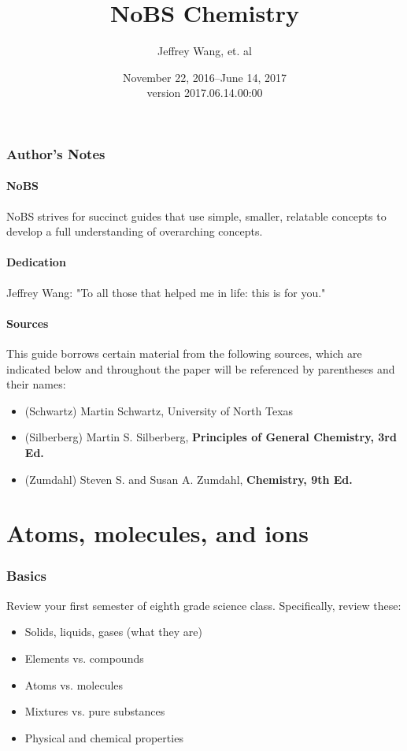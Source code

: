\documentclass[letterpaper, 12pt]{article}
\begin{document}
\title{NoBS Chemistry}
\author{Jeffrey Wang, et. al}
\date{November 22, 2016--June 14, 2017\\version 2017.06.14.00:00}
\maketitle


\setcounter{secnumdepth}{1}
\setcounter{section}{0}


\tableofcontents
\clearpage

\section*{Author's Notes}
	\subsection{NoBS}
	NoBS strives for succinct guides that use simple, smaller, relatable concepts to develop a full understanding of overarching concepts.
	\subsection{Dedication}
	Jeffrey Wang: "To all those that helped me in life: this is for you."
	\subsection{Sources}
	This guide borrows certain material from the following sources, which are indicated below and throughout the paper will be referenced by parentheses and their names:
	\begin{itemize}
		\item (Schwartz) Martin Schwartz, University of North Texas
		\item (Silberberg) Martin S. Silberberg,  \textbf{Principles of General Chemistry, 3rd Ed.}
		\item (Zumdahl) Steven S. and Susan A. Zumdahl, \textbf{Chemistry, 9th Ed.}
	\end{itemize}
\clearpage

	
\clearpage

\part{Atoms, molecules, and ions}

\section{Basics}
Review your first semester of eighth grade science class. Specifically, review these:
\begin{itemize}
	\item Solids, liquids, gases (what they are)
	\item Elements vs. compounds
	\item Atoms vs. molecules
	\item Mixtures vs. pure substances
	\item Physical and chemical properties
\end{itemize}
\end{document}
